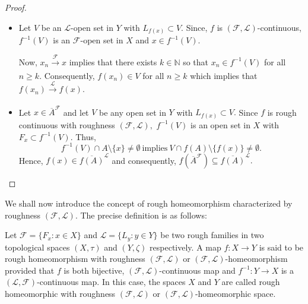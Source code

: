 \documentclass[11pt]{amsart}
\begin{document}
 \begin{proof}\begin{itemize}
     \item[(i)] Let $V$ be an $\mathscr{L}$-open set in $Y$ with $L_{f(x)}\subset V$. Since, $f$ is $(\mathscr{F},\mathscr{L})$-continuous, $f^{-1}(V)$ is an $\mathscr{F}$-open set in $X$ and $x\in f^{-1}(V)$. 
    
       Now, $x_n\xrightarrow[]{\mathscr{F}} x$ implies that there exists $k\in \mathbb{N}$ so that $x_n\in f^{-1}(V)$ for all $n\ge k.$ Consequently, $f(x_n)\in V$ for all $n\ge k$ which implies that $f(x_n)\xrightarrow[]{\mathscr{L}} f(x)$. 

       \item[(ii)] Let $x\in \overline{A}^\mathscr{F}$ and let $V$ be any open set in $Y$ with $L_{f(x)}\subset V.$ Since $f$ is rough continuous with roughness $(\mathscr{F},\mathscr{L}),$ $f^{-1}(V)$ is an open set in $X$ with $F_{x}\subset f^{-1}(V).$ Thus, $$f^{-1}(V)\cap A\setminus\{x\}\neq \emptyset~\text{implies}~V\cap f(A)\setminus \{f(x)\}\neq \emptyset.$$ Hence, $f(x)\in \overline{f(A)}^\mathscr{L}$ and consequently,   $f\left(\overline{A}^\mathscr{F}\right)\subseteq \overline{f(A)}^\mathscr{L}.$
 \end{itemize}
 \end{proof}

We shall now introduce the concept of rough homeomorphism characterized by roughness $(\mathscr{F},\mathscr{L})$. The precise definition is as follows:

\begin{definition}
Let $\mathscr{F}=\{F_x: x\in X\}$ and $\mathscr{L}=\{L_y: y\in Y\}$ be two rough families in two topological spaces \((X,\tau)\) and \((Y,\zeta)\) respectively. A map $f: X\rightarrow Y$ is  said to be rough homeomorphism with roughness $(\mathscr{F},\mathscr{L})$ or $(\mathscr{F},\mathscr{L})$-homeomorphism provided that $f$ is both bijective, $(\mathscr{F},\mathscr{L})$-continuous map and $f^{-1}: Y\to X$ is a $(\mathscr{L},\mathscr{F})$-continuous map. In this case, the spaces $X$ and $Y$ are called rough homeomorphic with roughness $(\mathscr{F},\mathscr{L})$ or $(\mathscr{F},\mathscr{L})$-homeomorphic space. 
\end{definition}
\end{document}
